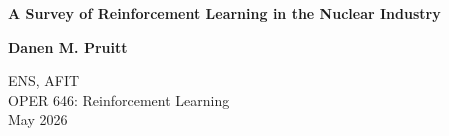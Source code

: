 \documentclass{article}
\begin{document}
\begin{titlepage}
    \centering
    \vspace*{2cm} %
    
    {\Huge \textbf{A Survey of Reinforcement Learning in the Nuclear Industry}} \\
    
    \vspace{2cm}
    
    {\Large \textbf{Danen M. Pruitt}} \\
    
    \vspace{1.5cm}
    
    ENS, AFIT \\
    OPER 646: Reinforcement Learning \\
    May 2026
    
    \vfill %
    
\end{titlepage}

\newpage
\tableofcontents
\newpage
\end{document}
